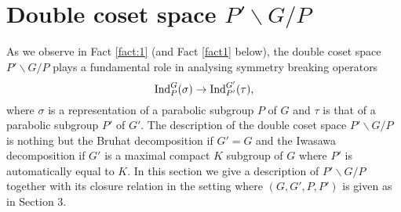 \documentclass[reqno,12pt]{pja00} %
\newcommand{\Ind}{\mbox{\normalfont Ind}}
\theoremstyle{definition}
\theoremstyle{exampstyle} \newtheorem{examp}[theorem]{Theorem}
\begin{document}
\section{Double coset space $P'\backslash G/P$}
As we observe in Fact \ref{fact:1} (and Fact \ref{fact1} below), the double coset space $P'\backslash G/P$ plays a fundamental role in analysing symmetry breaking operators\begin{equation*}
	\Ind_P^G(\sigma)\to\Ind_{P'}^{G'}(\tau),
\end{equation*}where $\sigma$ is a representation of a parabolic subgroup $P$ of $G$ and $\tau$ is that of a parabolic subgroup $P'$ of $G'$. The description of the double coset space $P'\backslash G/P$
is nothing but the Bruhat decomposition if $G'=G$ and the Iwasawa decomposition if $G'$ is a maximal compact $K$ subgroup of $G$ where $P'$ is automatically equal to $K$. In this section we give a description
of $P'\backslash G/P$ together with its closure relation in the setting where $(G,G',P,P')$ is given {as} in Section 3.
\end{document}
